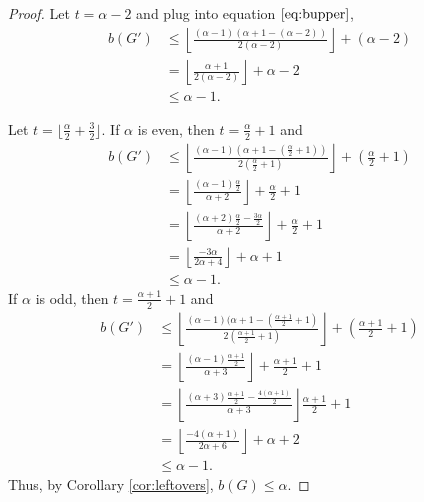 \documentclass[12pt]{article}
\begin{document}
\begin{proof}
    Let $t = \alpha - 2$ and plug into equation $\ref{eq:bupper}$,
    \begin{align*}
        b(G') &\leq \left\lfloor \frac{(\alpha - 1)(\alpha + 1 - (\alpha - 2))}{2(\alpha - 2)} \right\rfloor + (\alpha - 2)\\
        &= \left\lfloor \frac{\alpha + 1}{2(\alpha - 2)} \right\rfloor + \alpha - 2\\
        &\leq \alpha - 1.
    \end{align*}
    
    Let $t = \lfloor \frac{\alpha}{2} + \frac{3}{2}\rfloor$.
    If $\alpha$ is even, then $t = \frac{\alpha}{2} + 1$ and
    \begin{align*}
        b(G') &\leq \left\lfloor \frac{(\alpha - 1)(\alpha + 1 - (\frac{\alpha}{2} + 1))}{2(\frac{\alpha}{2} + 1)} \right\rfloor + (\frac{\alpha}{2} + 1)\\
        &= \left\lfloor \frac{(\alpha - 1)\frac{\alpha}{2}}{\alpha + 2} \right\rfloor + \frac{\alpha}{2} + 1\\
        &= \left\lfloor \frac{(\alpha + 2)\frac{\alpha}{2} - \frac{3\alpha}{2}}{\alpha + 2} \right\rfloor + \frac{\alpha}{2} + 1\\
        &= \left\lfloor \frac{-3\alpha}{2\alpha + 4} \right\rfloor + \alpha + 1\\
        &\leq \alpha - 1.
    \end{align*}
    If $\alpha$ is odd, then $t = \frac{\alpha + 1}{2} + 1$ and
    \begin{align*}
        b(G') &\leq \left\lfloor \frac{(\alpha - 1)(\alpha + 1 - (\frac{\alpha + 1}{2} + 1)}{2(\frac{\alpha + 1}{2} + 1)} \right\rfloor + (\frac{\alpha + 1}{2} + 1)\\
        &= \left\lfloor \frac{(\alpha - 1)\frac{\alpha + 1}{2}}{\alpha + 3} \right\rfloor + \frac{\alpha + 1}{2} + 1\\
        &= \left\lfloor \frac{(\alpha + 3)\frac{\alpha + 1}{2} - \frac{4(\alpha + 1)}{2}}{\alpha + 3} \right\rfloor \frac{\alpha + 1}{2} + 1\\
        &= \left\lfloor \frac{-4 (\alpha + 1)}{2\alpha + 6} \right\rfloor + \alpha + 2\\
        &\leq \alpha - 1.
    \end{align*}
    Thus, by Corollary \ref{cor:leftovers}, $b(G) \leq \alpha$.
    
\end{proof}


\end{document}

